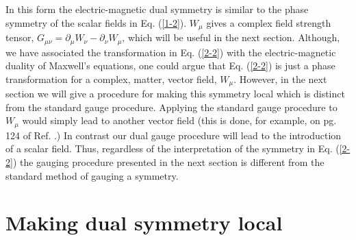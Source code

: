 \documentclass[a4paper,aps]{revtex4}
\begin{document}
In this form the electric-magnetic dual symmetry is
similar to the phase symmetry of the scalar fields in
Eq. (\ref{1-2}). $W_{\mu}$ gives a complex field
strength tensor, $G_{\mu \nu} = \partial_{\mu} W_{\nu} -
\partial _{\nu} W_{\mu}$, which will be useful in the next section.
Although, we have associated the transformation
in Eq. (\ref{2-2}) with the electric-magnetic duality of Maxwell's
equations, one could argue that Eq. (\ref{2-2}) is just a phase
transformation for a complex, matter, vector field, $W_{\mu}$. However,
in the next section we will give a procedure for making this symmetry
local which is distinct from the standard gauge procedure. Applying
the standard gauge procedure to $W_{\mu}$ would simply lead
to another vector field (this is done, for example, on pg. 124 of
Ref. \cite{fels}.) In contrast our dual gauge procedure will
lead to the introduction of a scalar field. Thus, regardless of
the interpretation of the symmetry in Eq. (\ref{2-2}) the gauging
procedure presented in the next section is different from the
standard method of gauging a symmetry.

\section{Making dual symmetry local}
\end{document}
